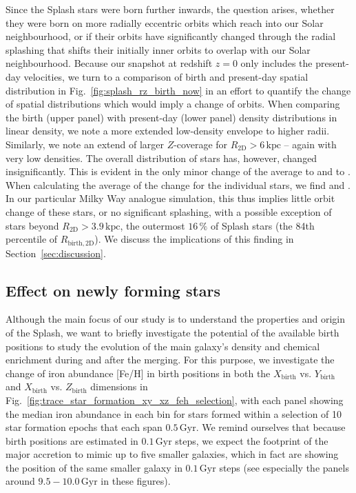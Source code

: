 \documentclass[fleqn,usenatbib]{mnras}
\begin{document}
Since the Splash stars were born further inwards, the question arises, whether they were born on more radially eccentric orbits which reach into our Solar neighbourhood, or if their orbits have significantly changed through the radial splashing that shifts their initially inner orbits to overlap with our Solar neighbourhood. Because our snapshot at redshift $z = 0$ only includes the present-day velocities, we turn to a comparison of birth and present-day spatial distribution in Fig.~\ref{fig:splash_rz_birth_now} in an effort to quantify the change of spatial distributions which would imply a change of orbits. When comparing the birth (upper panel) with present-day (lower panel) density distributions in linear density, we note a more extended low-density envelope to higher radii. Similarly, we note an extend of larger $Z$-coverage for $R_\mathrm{2D} > 6\,\mathrm{kpc}$ -- again with very low densities. The overall distribution of stars has, however, changed insignificantly. This is evident in the only minor change of the average  to  and  to . When calculating the average of the change for the individual stars, we find  and . In our particular Milky Way analogue simulation, this thus implies little orbit change of these stars, or no significant splashing, with a possible exception of stars beyond $R_\mathrm{2D} > 3.9\,\mathrm{kpc}$, the outermost $16\,\mathrm{\%}$ of Splash stars (the 84th percentile of $R_\mathrm{birth,2D}$). We discuss the implications of this finding in Section~\ref{sec:discussion}.

\subsection{Effect on newly forming stars}

Although the main focus of our study is to understand the properties and origin of the Splash, we want to briefly investigate the potential of the available birth positions to study the evolution of the main galaxy's density and chemical enrichment during and after the merging. For this purpose, we investigate the change of iron abundance [Fe/H] in birth positions in both the $X_\mathrm{birth}$ vs. $Y_\mathrm{birth}$ and $X_\mathrm{birth}$ vs. $Z_\mathrm{birth}$ dimensions in Fig.~\ref{fig:trace_star_formation_xy_xz_feh_selection}, with each panel showing the median iron abundance in each bin for stars formed within a selection of 10 star formation epochs that each span $0.5\,\mathrm{Gyr}$. We remind ourselves that because birth positions are estimated in $0.1\,\mathrm{Gyr}$ steps, we expect the footprint of the major accretion to mimic up to five smaller galaxies, which in fact are showing the position of the same smaller galaxy in $0.1\,\mathrm{Gyr}$ steps (see especially the panels around $9.5-10.0\,\mathrm{Gyr}$ in these figures).
\end{document}
